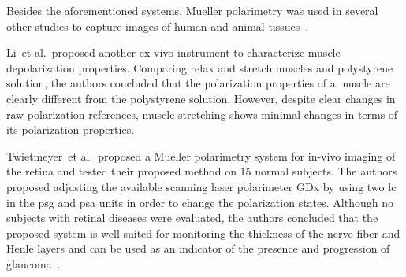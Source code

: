 Besides the aforementioned systems, Mueller polarimetry was used in several other studies to capture images of human and animal tissues~\cite{twietmeyer2008mueller,li2009mueller}.

Li~et al.\,\cite{li2009mueller} proposed another ex-vivo instrument to characterize muscle depolarization properties.
Comparing relax and stretch muscles and polystyrene solution, the authors concluded that the polarization properties of a muscle are clearly different from the polystyrene solution.
However, despite clear changes in raw polarization references, muscle stretching shows minimal changes in terms of its polarization properties. 

Twietmeyer~et al.\,\cite{twietmeyer2008mueller} proposed a Mueller polarimetry system for in-vivo imaging of the retina and tested their proposed method on 15 normal subjects.
The authors proposed adjusting the available scanning laser polarimeter GDx by using two \ac{lc} in the \ac{psg} and \ac{psa} units in order to change the polarization states.
Although no subjects with retinal diseases were evaluated, the authors concluded that the proposed system is well suited for monitoring the thickness of the nerve fiber and Henle layers and can be used as an indicator of the presence and progression of glaucoma~\cite{twietmeyer2008mueller}.






